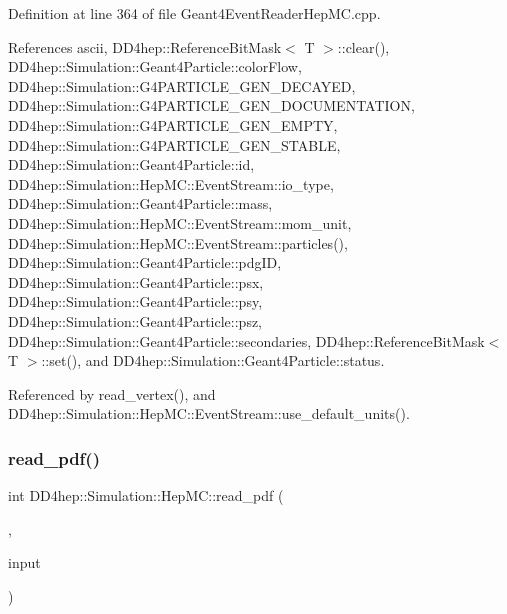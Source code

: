Definition at line 364 of file Geant4\+Event\+Reader\+Hep\+M\+C.\+cpp.



References ascii, D\+D4hep\+::\+Reference\+Bit\+Mask$<$ T $>$\+::clear(), D\+D4hep\+::\+Simulation\+::\+Geant4\+Particle\+::color\+Flow, D\+D4hep\+::\+Simulation\+::\+G4\+P\+A\+R\+T\+I\+C\+L\+E\+\_\+\+G\+E\+N\+\_\+\+D\+E\+C\+A\+Y\+ED, D\+D4hep\+::\+Simulation\+::\+G4\+P\+A\+R\+T\+I\+C\+L\+E\+\_\+\+G\+E\+N\+\_\+\+D\+O\+C\+U\+M\+E\+N\+T\+A\+T\+I\+ON, D\+D4hep\+::\+Simulation\+::\+G4\+P\+A\+R\+T\+I\+C\+L\+E\+\_\+\+G\+E\+N\+\_\+\+E\+M\+P\+TY, D\+D4hep\+::\+Simulation\+::\+G4\+P\+A\+R\+T\+I\+C\+L\+E\+\_\+\+G\+E\+N\+\_\+\+S\+T\+A\+B\+LE, D\+D4hep\+::\+Simulation\+::\+Geant4\+Particle\+::id, D\+D4hep\+::\+Simulation\+::\+Hep\+M\+C\+::\+Event\+Stream\+::io\+\_\+type, D\+D4hep\+::\+Simulation\+::\+Geant4\+Particle\+::mass, D\+D4hep\+::\+Simulation\+::\+Hep\+M\+C\+::\+Event\+Stream\+::mom\+\_\+unit, D\+D4hep\+::\+Simulation\+::\+Hep\+M\+C\+::\+Event\+Stream\+::particles(), D\+D4hep\+::\+Simulation\+::\+Geant4\+Particle\+::pdg\+ID, D\+D4hep\+::\+Simulation\+::\+Geant4\+Particle\+::psx, D\+D4hep\+::\+Simulation\+::\+Geant4\+Particle\+::psy, D\+D4hep\+::\+Simulation\+::\+Geant4\+Particle\+::psz, D\+D4hep\+::\+Simulation\+::\+Geant4\+Particle\+::secondaries, D\+D4hep\+::\+Reference\+Bit\+Mask$<$ T $>$\+::set(), and D\+D4hep\+::\+Simulation\+::\+Geant4\+Particle\+::status.



Referenced by read\+\_\+vertex(), and D\+D4hep\+::\+Simulation\+::\+Hep\+M\+C\+::\+Event\+Stream\+::use\+\_\+default\+\_\+units().

\hypertarget{namespace_d_d4hep_1_1_simulation_1_1_hep_m_c_a599dd238f1b1dc069a14f3bf57c09cfb}{}\label{namespace_d_d4hep_1_1_simulation_1_1_hep_m_c_a599dd238f1b1dc069a14f3bf57c09cfb} 
\subsubsection{\texorpdfstring{read\+\_\+pdf()}{read\_pdf()}}
{\footnotesize\ttfamily int D\+D4hep\+::\+Simulation\+::\+Hep\+M\+C\+::read\+\_\+pdf (\begin{DoxyParamCaption}\item[{\hyperlink{class_d_d4hep_1_1_simulation_1_1_hep_m_c_1_1_event_stream}{Event\+Stream} \&}]{,  }\item[{istringstream \&}]{input }\end{DoxyParamCaption})}



